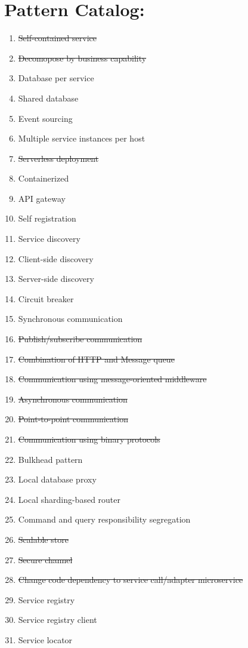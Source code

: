\documentclass{article}
\theoremstyle{mytheoremstyle}
\theoremstyle{mytheoremstyle}
\theoremstyle{myproblemstyle}
\begin{document}
\section{Pattern Catalog:}
\begin{enumerate}
  \item \sout{Self-contained service} 
  \item \sout{Decomopose by business capability} 
  \item Database per service 
  \item Shared database 
  \item Event sourcing 
  \item Multiple service instances per host
  \item \sout{Serverless deployment} 
  \item Containerized 
  \item API gateway
  \item Self registration 
  \item Service discovery 
  \item Client-side discovery
  \item Server-side discovery 
  \item Circuit breaker
  \item Synchronous communication
  \item \sout{Publish/subscribe communication}
  \item \sout{Combination of HTTP and Message queue}
  \item \sout{Communication using message-oriented middleware}
  \item \sout{Asynchronous communication}
  \item \sout{Point-to-point communication}
  \item \sout{Communication using binary protocols}
  \item Bulkhead pattern
  \item Local database proxy
  \item Local sharding-based router
  \item Command and query responsibility segregation
  \item \sout{Scalable store}
  \item \sout{Secure channel}
  \item \sout{Change code dependency to service call/adapter microservice}
  \item Service registry 
  \item Service registry client 
  \item Service locator 

\end{enumerate}
\end{document}
